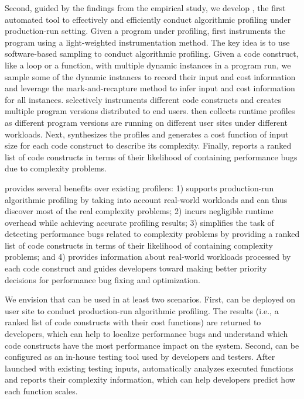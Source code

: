 Second, guided by the findings from the empirical
study, we develop \Tool, the first automated tool to effectively and efficiently 
conduct algorithmic profiling under production-run setting.
Given a program under profiling, \Tool first instruments the program
using a light-weighted instrumentation method. 
The key idea is to use software-based sampling to conduct algorithmic profiling.
Given a code construct, like a loop or a function,  
with multiple dynamic instances in a program run,
we sample some of the dynamic instances to record their input and cost information
and leverage the mark-and-recapture
method \citep{mark-recapture} to infer input and cost information for all instances.
\Tool selectively instruments different code constructs and 
creates multiple program versions distributed to end users.
\Tool then collects runtime profiles as different program versions are running
on different user sites under different workloads.
Next, \Tool synthesizes the profiles and generates a cost function of input size
for each code construct to describe its complexity. 
Finally, \Tool  reports a ranked list of code constructs in terms of their likelihood
of containing performance bugs due to complexity problems. 




\Tool provides several benefits over existing profilers:
1) \Tool supports production-run algorithmic profiling by taking into account
real-world workloads and can thus discover most of the real complexity problems;
2) \Tool incurs negligible runtime overhead while achieving accurate profiling results;
3) \Tool  simplifies the task of detecting performance bugs related to complexity
problems by providing a ranked list of code constructs in terms of their
likelihood of containing complexity problems;
and 4) \Tool provides information about real-world workloads 
processed by each code construct and guides developers toward making better priority 
decisions for performance bug fixing and optimization.


We envision that \Tool can be used in at least two scenarios. 
First, \Tool can be deployed on user site to conduct production-run algorithmic
profiling. The results (i.e., a ranked list of code constructs with their cost functions)
are returned to developers, which can help to localize performance 
bugs and understand 
which code constructs have the most performance impact on the system.
Second, \Tool can be configured as an in-house testing tool used by 
developers and testers. After launched with existing testing inputs, 
\Tool  automatically analyzes executed functions and 
reports their complexity information,
which can help developers predict how each function scales. 





